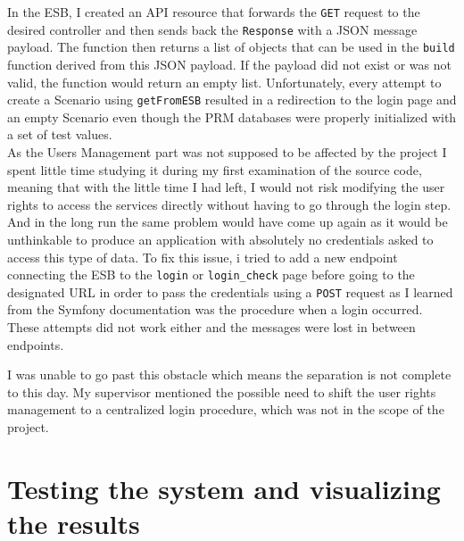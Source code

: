 \documentclass[12pt,a4paper,twoside]{article}
\begin{document}
In the ESB, I created an API resource that forwards the \texttt{GET} request to the desired controller and then sends back the \texttt{Response} with a JSON message payload. The function then returns a list of objects that can be used in the \texttt{build} function derived from this JSON payload. If the payload did not exist or was not valid, the function would return an empty list.
Unfortunately, every attempt to create a Scenario using \texttt{getFromESB} resulted in a redirection to the login page and an empty Scenario even though the PRM databases were properly initialized with a set of test values.\\
As the Users Management part was not supposed to be affected by the project I spent little time studying it during my first examination of the source code, meaning that with the little time I had left, I would not risk modifying the user rights to access the services directly without having to go through the login step. And in the long run the same problem would have come up again as it would be unthinkable to produce an application with absolutely no credentials asked to access this type of data.
To fix this issue, i tried to add a new endpoint connecting the ESB to the \texttt{login} or \texttt{login\_check} page before going to the designated URL in order to pass the credentials using a \texttt{POST} request as I learned from the Symfony documentation was the procedure when a login occurred. These attempts did not work either and the messages were lost in between endpoints. 

I was unable to go past this obstacle which means the separation is not complete to this day. My supervisor mentioned the possible need to shift the user rights management to a centralized login procedure, which was not in the scope of the project.
\section{Testing the system and visualizing the results}
\end{document}

